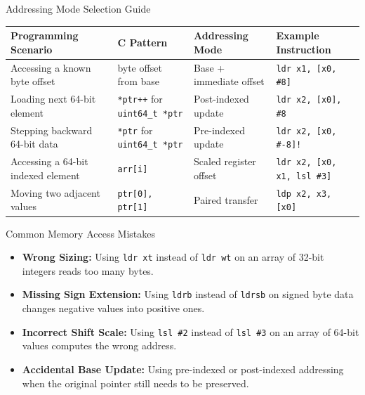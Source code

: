 \documentclass[aspectratio=169,11pt,t]{beamer}
\newcommand{\key}[1]{\textbf{#1}}
\newcommand{\code}[1]{\texttt{#1}}
\begin{document}
\begin{frame}{Addressing Mode Selection Guide}
\vspace{0.25cm}
\begin{center}
\small
\renewcommand{\arraystretch}{1.22}
\setlength{\tabcolsep}{5pt}
\begin{tabular}{>{\raggedright\arraybackslash}p{3.0cm}
                >{\raggedright\arraybackslash}p{2.35cm}
                >{\raggedright\arraybackslash}p{3.0cm}
                >{\raggedright\arraybackslash}p{4.2cm}}
\toprule
\rowcolor{white}
\textbf{Programming Scenario} & \textbf{C Pattern} & \textbf{Addressing Mode} & \textbf{Example Instruction} \\
\midrule
Accessing a known byte offset & byte offset from base & Base + immediate offset & \code{ldr x1, [x0, \#8]} \\
Loading next 64-bit element & \code{*ptr++} for \code{uint64\_t *ptr} & Post-indexed update & \code{ldr x2, [x0], \#8} \\
Stepping backward 64-bit data & \code{*\char45{}\char45{}ptr} for \code{uint64\_t *ptr} & Pre-indexed update & \code{ldr x2, [x0, \#-8]!} \\
Accessing a 64-bit indexed element & \code{arr[i]} & Scaled register offset & \code{ldr x2, [x0, x1, lsl \#3]} \\
Moving two adjacent values & \code{ptr[0], ptr[1]} & Paired transfer & \code{ldp x2, x3, [x0]} \\
\bottomrule
\end{tabular}
\end{center}
\end{frame}


\begin{frame}{Common Memory Access Mistakes}
\large
\begin{itemize}\setlength{\itemsep}{6pt}
  \item \key{Wrong Sizing:} Using \code{ldr xt} instead of \code{ldr wt} on an array of 32-bit integers reads too many bytes.
  \item \key{Missing Sign Extension:} Using \code{ldrb} instead of \code{ldrsb} on signed byte data changes negative values into positive ones.
  \item \key{Incorrect Shift Scale:} Using \code{lsl \#2} instead of \code{lsl \#3} on an array of 64-bit values computes the wrong address.
  \item \key{Accidental Base Update:} Using pre-indexed or post-indexed addressing when the original pointer still needs to be preserved.
\end{itemize}
\end{frame}
\end{document}
